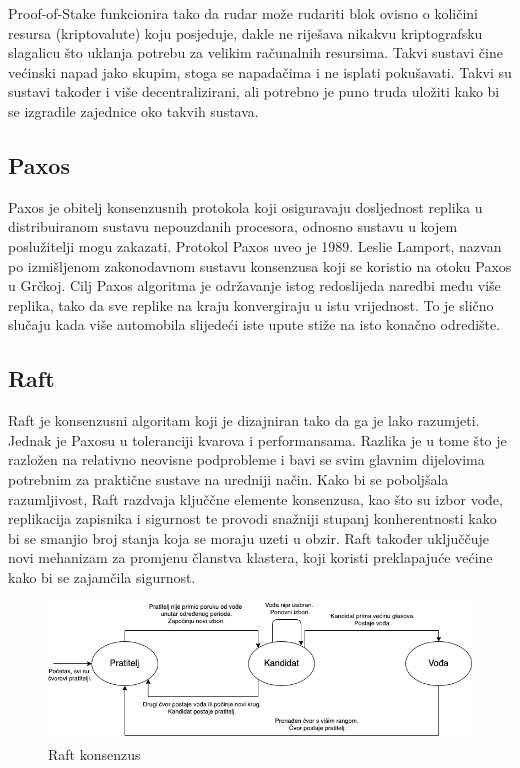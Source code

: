 \documentclass[times, utf8, diplomski]{fer}
\begin{document}
Proof-of-Stake funkcionira tako da rudar može rudariti blok ovisno o količini resursa (kriptovalute) koju posjeduje, dakle ne riješava nikakvu kriptografsku slagalicu što uklanja potrebu za velikim računalnih resursima. Takvi sustavi čine većinski napad jako skupim, stoga se napadačima i ne isplati pokušavati. Takvi su sustavi također i više decentralizirani, ali potrebno je puno truda uložiti kako bi se izgradile zajednice oko takvih sustava.

\subsection{Paxos}

Paxos je obitelj konsenzusnih protokola koji osiguravaju dosljednost replika u distribuiranom sustavu nepouzdanih procesora, odnosno sustavu u kojem poslužitelji mogu zakazati. Protokol Paxos uveo je 1989. Leslie Lamport, nazvan po izmišljenom zakonodavnom sustavu konsenzusa koji se koristio na otoku Paxos u Grčkoj. Cilj Paxos algoritma je održavanje istog redoslijeda naredbi među više replika, tako da sve replike na kraju konvergiraju u istu vrijednost. To je slično slučaju kada više automobila slijedeći iste upute stiže na isto konačno odredište.

\subsection{Raft}

Raft je konsenzusni algoritam koji je dizajniran tako da ga je lako razumjeti. Jednak je Paxosu u toleranciji kvarova i performansama. Razlika je u tome što je razložen na relativno neovisne podprobleme i bavi se svim glavnim dijelovima potrebnim za praktične sustave na uredniji način. Kako bi se poboljšala razumljivost, Raft razdvaja ključčne elemente konsenzusa, kao što su izbor vođe, replikacija zapisnika i sigurnost te provodi snažniji stupanj konherentnosti kako bi se smanjio broj stanja koja se moraju uzeti u obzir. Raft također uključčuje novi mehanizam za promjenu članstva klastera,
koji koristi preklapajuće većine kako bi se zajamčila sigurnost. \cite{raft}

\begin{figure}[htb]
\centering
\includegraphics[width=12cm]{imgs/Raft.png}
\caption{Raft konsenzus}
\label{fig:raft}
\end{figure}
\end{document}
